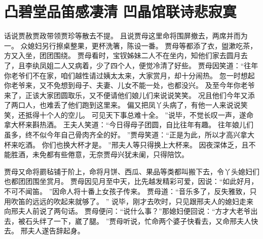 \chapter{凸碧堂品笛感凄清 \quad 凹晶馆联诗悲寂寞}
\par
话说贾赦贾政带领贾珍等散去不提。
且说贾母这里命将围屏撤去，两席并而为一。
众媳妇另行擦桌整果，更杯洗箸，陈设一番。
贾母等都添了衣，盥漱吃茶，方又入坐，团团围绕。
贾母看时，宝钗姊妹二人不在坐内，知他们家去圆月去了，且李纨凤姐二人又病着，少了四个人，便觉冷清了好些。
贾母因笑道：“往年你老爷们不在家，咱们越性请过姨太太来，大家赏月，却十分闹热。
忽一时想起你老爷来，又不免想到母子、夫妻、儿女不能一处，也都没兴。
及至今年你老爷来了，正该大家团圆取乐，又不便请他们娘儿们来说说笑笑。
况且他们今年又添了两口人，也难丢了他们跑到这里来。
偏又把凤丫头病了，有他一人来说说笑笑，还抵得十个人的空儿。
可见天下事总难十全。
”说毕，不觉长叹一声，遂命拿大杯来斟热酒。
王夫人笑道：“今日得母子团圆，自比往年有趣。
往年娘儿们虽多，终不似今年自己骨肉齐全的好。
”贾母笑道：“正是为此，所以才高兴拿大杯来吃酒。
你们也换大杯才是。
”邢夫人等只得换上大杯来。
因夜深体乏，且不能胜酒，未免都有些倦意，无奈贾母兴犹未阑，只得陪饮。
\par
贾母又命将罽毡铺于阶上，命将月饼、西瓜、果品等类都叫搬下去，令丫头媳妇们也都团团围坐赏月。
贾母因见月至中天，比先越发精彩可爱，因说：“如此好月，不可不闻笛。
”因命人将十番上女孩子传来。
贾母道：“音乐多了，反失雅致，只用吹笛的远远的吹起来就够了。
”
说毕，刚才去吹时，只见跟邢夫人的媳妇走来向邢夫人前说了两句话。
贾母便问：“说什么事？”那媳妇便回说：“方才大老爷出去，被石头绊了一下，崴了腿。
”贾母听说，忙命两个婆子快看去，又命邢夫人快去。
邢夫人遂告辞起身。
